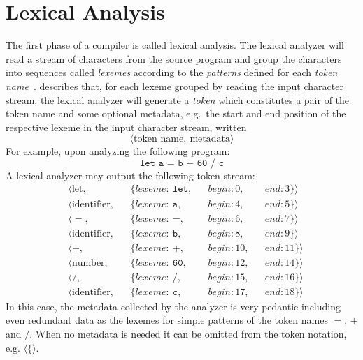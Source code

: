 \documentclass[
  oneside,
  english,
  coorientadorbanca,
  embeddedlogo,
  noabntexcite
]{ufsc-thesis-rn46-2019}
\newcommand{\code}[1]{\texttt{#1}}
\newcommand{\token}[1]{$\langle\code{#1}\rangle$}
\begin{document}
\section{Lexical Analysis}\label{chapter:background:sec:lexical}

The first phase of a compiler is called lexical analysis.
The lexical analyzer will read a stream of characters from the source program and group the characters into sequences called \textit{lexemes} according to the \textit{patterns} defined for each \textit{token name}~\cite{Aho:2006:CPT:1177220}.
\textcite{Aho:2006:CPT:1177220} describes that, for each lexeme grouped by reading the input character stream, the lexical analyzer will generate a \textit{token} which constitutes a pair of the token name and some optional metadata, e.g.\ the start and end position of the respective lexeme in the input character stream, written
\begin{equation*}
  \langle \textrm{token name},\ \textrm{metadata}\rangle
\end{equation*}
For example, upon analyzing the following program:
\begin{equation*}
  \code{let a = b + 60 / c}
\end{equation*}
A lexical analyzer may output the following token stream:
\begin{equation}\label{figure:introduction_token_stream}
  \begin{aligned}
     & \langle \textrm{let},        &  & \{lexeme:\ \code{let}, &  & begin: 0,  &  & end: 3\}\rangle  \\
     & \langle \textrm{identifier}, &  & \{lexeme:\ \code{a},   &  & begin: 4,  &  & end: 5\}\rangle  \\
     & \langle =,                   &  & \{lexeme:\ \code{=},   &  & begin: 6,  &  & end: 7\}\rangle  \\
     & \langle \textrm{identifier}, &  & \{lexeme:\ \code{b},   &  & begin: 8,  &  & end: 9\}\rangle  \\
     & \langle +,                   &  & \{lexeme:\ \code{+},   &  & begin: 10, &  & end: 11\}\rangle \\
     & \langle \textrm{number},     &  & \{lexeme:\ \code{60},  &  & begin: 12, &  & end: 14\}\rangle \\
     & \langle /,                   &  & \{lexeme:\ \code{/},   &  & begin: 15, &  & end: 16\}\rangle \\
     & \langle \textrm{identifier}, &  & \{lexeme:\ \code{c},   &  & begin: 17, &  & end: 18\}\rangle
  \end{aligned}
\end{equation}
In this case, the metadata collected by the analyzer is very pedantic including even redundant data as the lexemes for simple patterns of the token names $=$, $+$ and $/$.
When no metadata is needed it can be omitted from the token notation, e.g. \token{\{}.
\end{document}
